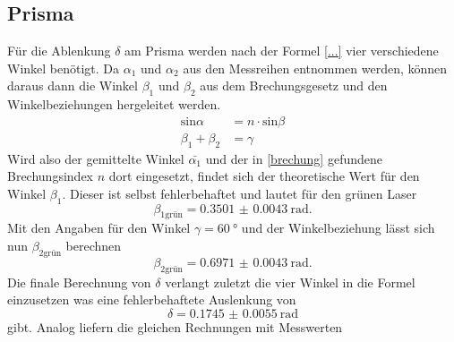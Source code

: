 \subsection{Prisma}
Für die Ablenkung $\delta$ am Prisma werden nach der Formel \eqref{...} vier verschiedene Winkel benötigt. 
Da $\alpha_1$ und $\alpha_2$  aus den Messreihen entnommen werden, können daraus dann die Winkel $\beta_1$ und $\beta_2$ aus dem Brechungsgesetz und den Winkelbeziehungen hergeleitet werden.
\begin{align*}
    \text{sin}\alpha &= n \cdot \text{sin}\beta \\
    \beta_1 + \beta_2 &= \gamma
\end{align*}
Wird also der gemittelte Winkel $\bar{\alpha_1}$ und der in \ref{brechung} gefundene Brechungsindex $n$ dort eingesetzt, findet
sich der theoretische Wert für den Winkel $\beta_1$. Dieser ist selbst fehlerbehaftet und lautet für den grünen Laser
\begin{equation}
   \beta_{1\text{grün}} = \SI{0.3501(00043)}{\radian}.
\end{equation}
Mit den Angaben für den Winkel $\gamma = \SI{60}{\degree}$ \cite{skript} und der Winkelbeziehung
lässt sich nun $\beta_{2\text{grün}}$ berechnen
\begin{equation}
    \beta_{2\text{grün}} = \SI{0.6971(00043)}{\radian}.
\end{equation}
Die finale Berechnung von $\delta$ verlangt zuletzt die vier Winkel in die Formel einzusetzen was eine fehlerbehaftete 
Auslenkung von 
\begin{equation}
    \delta = \SI{0.1745(00055)}{\radian}
\end{equation}
gibt. Analog liefern die gleichen Rechnungen mit Messwerten 